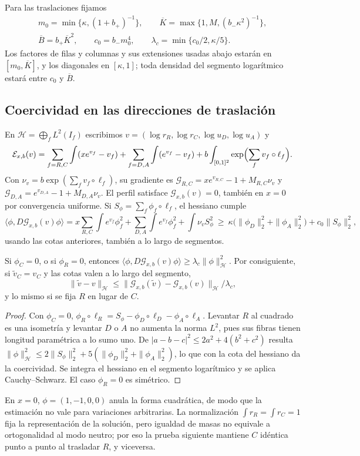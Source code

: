 Para las traslaciones fijamos
\begin{gather*}
 m_0=\min\{\kappa,(1+b_+)^{-1}\},\qquad \overline K=\max\{1,M,(b_-\kappa^2)^{-1}\},\\
 \overline B=b_+\overline K^2,\qquad c_0=b_-m_0^4,\qquad \lambda_c=\min\{c_0/2,\kappa/5\}.
\end{gather*}
Los factores de filas y columnas y sus extensiones usadas abajo estarán en $[m_0,\overline K]$,
y los diagonales en $[\kappa,1]$; toda densidad del segmento logarítmico estará entre $c_0$ y
$\overline B$.

\subsection{Coercividad en las direcciones de traslación}

En $\mathcal H=\bigoplus_fL^2(I_f)$ escribimos $v=(\log r_R,\log r_C,\log u_D,\log u_A)$ y
\[
 \mathcal E_{x,b}(v)=\sum_{f=R,C}\int(xe^{v_f}-v_f)+\sum_{f=D,A}\int(e^{v_f}-v_f)
 +b\int_{[0,1]^2}\exp\Bigl(\sum_fv_f\circ\ell_f\Bigr).
\]
Con $\nu_v=b\exp(\sum_fv_f\circ\ell_f)$, su gradiente es
$\mathcal G_{R,C}=xe^{v_{R,C}}-1+M_{R,C}\nu_v$ y $\mathcal G_{D,A}=e^{v_{D,A}}-1+M_{D,A}\nu_v$. El
perfil satisface $\mathcal G_{x,b}(v)=0$, también en $x=0$ por convergencia uniforme. Si
$S_\phi=\sum_f\phi_f\circ\ell_f$, el hessiano cumple
\[
 \langle\phi,D\mathcal G_{x,b}(v)\phi\rangle=x\sum_{R,C}\int e^{v_f}\phi_f^2+\sum_{D,A}\int e^{v_f}\phi_f^2
 +\int\nu_vS_\phi^2\ \ge\ \kappa\bigl(\|\phi_D\|_2^2+\|\phi_A\|_2^2\bigr)+c_0\|S_\phi\|_2^2 ,
\]
usando las cotas anteriores, también a lo largo de segmentos.

\begin{lema}\label{lem:coercividad}
Si $\phi_C=0$, o si $\phi_R=0$, entonces
$\langle\phi,D\mathcal G_{x,b}(v)\phi\rangle\ge\lambda_c\|\phi\|_{\mathcal H}^2$.
Por consiguiente, si $\widetilde v_C=v_C$ y las cotas valen a lo largo del segmento,
\[
 \|\widetilde v-v\|_{\mathcal H}\le\|\mathcal G_{x,b}(\widetilde v)-\mathcal
G_{x,b}(v)\|_{\mathcal H}/\lambda_c ,
\]
y lo mismo si se fija $R$ en lugar de $C$.
\end{lema}

\begin{proof}
Con $\phi_C=0$, $\phi_R\circ\ell_R=S_\phi-\phi_D\circ\ell_D-\phi_A\circ\ell_A$. Levantar $R$ al cuadrado es
una
isometría y levantar $D$ o $A$ no aumenta la norma $L^2$, pues sus fibras tienen longitud
paramétrica a lo sumo uno. De $|a-b-c|^2\le2a^2+4(b^2+c^2)$ resulta
$\|\phi\|_{\mathcal H}^2\le2\|S_\phi\|_2^2+5(\|\phi_D\|_2^2+\|\phi_A\|_2^2)$, lo que con la cota del
hessiano
da la coercividad. Se integra el hessiano en el segmento logarítmico y se aplica
Cauchy--Schwarz. El caso $\phi_R=0$ es simétrico.
\end{proof}

En $x=0$, $\phi=(1,-1,0,0)$ anula la forma cuadrática, de modo que la estimación no vale para
variaciones arbitrarias. La normalización $\int r_R=\int r_C=1$ fija la representación de la
solución, pero igualdad de masas no equivale a ortogonalidad al modo neutro; por eso la prueba
siguiente mantiene $C$ idéntica punto a punto al trasladar $R$, y viceversa.
